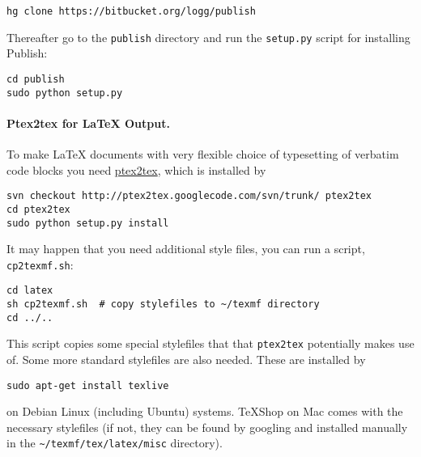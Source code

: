 \documentclass[%
oneside,                 %
final,                   %
10pt]{article}
\begin{document}
\vspace{4pt}
\begin{Verbatim}[numbers=none,frame=lines,fontsize=\fontsize{9pt}{9pt},labelposition=topline,framesep=2.5mm,framerule=0.7pt]
hg clone https://bitbucket.org/logg/publish
\end{Verbatim}
Thereafter go to the {\fontsize{10pt}{10pt}\Verb!publish!} directory and run the {\fontsize{10pt}{10pt}\Verb!setup.py!} script
for installing Publish:

\vspace{4pt}
\begin{Verbatim}[numbers=none,frame=lines,fontsize=\fontsize{9pt}{9pt},labelposition=topline,framesep=2.5mm,framerule=0.7pt]
cd publish
sudo python setup.py
\end{Verbatim}


\paragraph{Ptex2tex for {\LaTeX} Output.}
To make {\LaTeX} documents with very flexible choice of typesetting of
verbatim code blocks you need \href{{http://code.google.com/p/ptex2tex}}{ptex2tex},
which is installed by

\vspace{4pt}
\begin{Verbatim}[numbers=none,frame=lines,fontsize=\fontsize{9pt}{9pt},labelposition=topline,framesep=2.5mm,framerule=0.7pt]
svn checkout http://ptex2tex.googlecode.com/svn/trunk/ ptex2tex
cd ptex2tex
sudo python setup.py install
\end{Verbatim}
It may happen that you need additional style files, you can run
a script, {\fontsize{10pt}{10pt}\Verb!cp2texmf.sh!}:

\vspace{4pt}
\begin{Verbatim}[numbers=none,frame=lines,fontsize=\fontsize{9pt}{9pt},labelposition=topline,framesep=2.5mm,framerule=0.7pt]
cd latex
sh cp2texmf.sh  # copy stylefiles to ~/texmf directory
cd ../..
\end{Verbatim}
This script copies some special stylefiles that
that {\fontsize{10pt}{10pt}\Verb!ptex2tex!} potentially makes use of. Some more standard stylefiles
are also needed. These are installed by

\vspace{4pt}
\begin{Verbatim}[numbers=none,frame=lines,fontsize=\fontsize{9pt}{9pt},labelposition=topline,framesep=2.5mm,framerule=0.7pt]
sudo apt-get install texlive
\end{Verbatim}
on Debian Linux (including Ubuntu) systems. TeXShop on Mac comes with
the necessary stylefiles (if not, they can be found by googling and installed
manually in the {\fontsize{10pt}{10pt}\Verb!~/texmf/tex/latex/misc!} directory).
\end{document}
